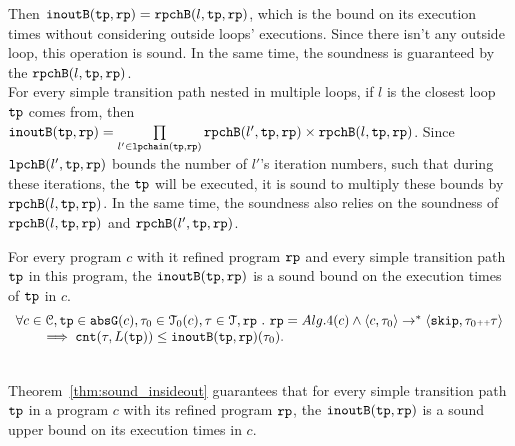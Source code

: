 \begin{itemize}
Then $\mathtt{inoutB}(\mathtt{tp}, \mathtt{rp}) = \mathtt{rpchB}(l, \mathtt{tp}, \mathtt{rp})$, which is the bound on its execution times without considering
outside loops' executions. Since there isn't any outside loop, this operation is sound.
In the same time, the soundness is guaranteed by the $\mathtt{rpchB}(l, \mathtt{tp}, \mathtt{rp})$.
\\
For every simple transition path nested in multiple loops, if $l$ is the closest loop $\mathtt{tp}$ comes from, then
$\mathtt{inoutB}(\mathtt{tp}, \mathtt{rp}) =
\prod\limits_{l' \in \mathtt{lpchain}(\mathtt{tp}, \mathtt{rp})} \mathtt{rpchB}(l', \mathtt{tp}, \mathtt{rp}) \times \mathtt{rpchB}(l, \mathtt{tp}, \mathtt{rp})$.
Since $\mathtt{lpchB}(l', \mathtt{tp}, \mathtt{rp})$ bounds the number of $l'$'s iteration numbers,
such that during these iterations, the $\mathtt{tp}$ will be executed,
it is sound to multiply these bounds by $\mathtt{rpchB}(l, \mathtt{tp}, \mathtt{rp})$.
In the same time, the soundness also relies on the soundness of $\mathtt{rpchB}(l, \mathtt{tp}, \mathtt{rp})$ and $\mathtt{rpchB}(l', \mathtt{tp}, \mathtt{rp})$. 
\end{itemize}
%
\begin{thm}
  \label{thm:sound_insideout}
  For every program $c$ with it refined program $\mathtt{rp}$ and 
  every simple transition path $\mathtt{tp}$ in this program,
   the $\mathtt{inoutB}(\mathtt{tp}, \mathtt{rp})$
is a sound bound on the execution times of $\mathtt{tp}$ in $c$.
  \[
    \begin{array}{l}
    \forall c \in \mathcal{C}, \mathtt{tp} \in \mathtt{abs}{\mathtt{G}}(c), \mathtt{\tau}_0 \in \mathcal{T}_0(c), \mathtt{\tau} \in \mathcal{T}, \mathtt{rp} ~.~ 
    \mathtt{rp} = Alg.4(c)
    \land
    \langle c, \mathtt{\tau}_0 \rangle \to^* 
    \langle {\ensuremath{\mathtt{skip}}, \ensuremath{\mathtt{\tau}}_0 {\scriptscriptstyle ++}\ensuremath{\mathtt{\tau}}} \rangle
    \\ \qquad
    \implies
    \mathtt{cnt}(\mathtt{\tau}, L(\mathtt{tp})) \leq \mathtt{inoutB}(\mathtt{tp}, \mathtt{rp})(\mathtt{\tau}_0).
    \end{array}
    \]
\end{thm}
\\
Theorem~\ref{thm:sound_insideout} guarantees that
for every simple transition path $\mathtt{tp}$ in a program $c$ with its refined program $\mathtt{rp}$,
the $\mathtt{inoutB}(\mathtt{tp}, \mathtt{rp})$
is a sound upper bound on its execution times in $c$.
%
